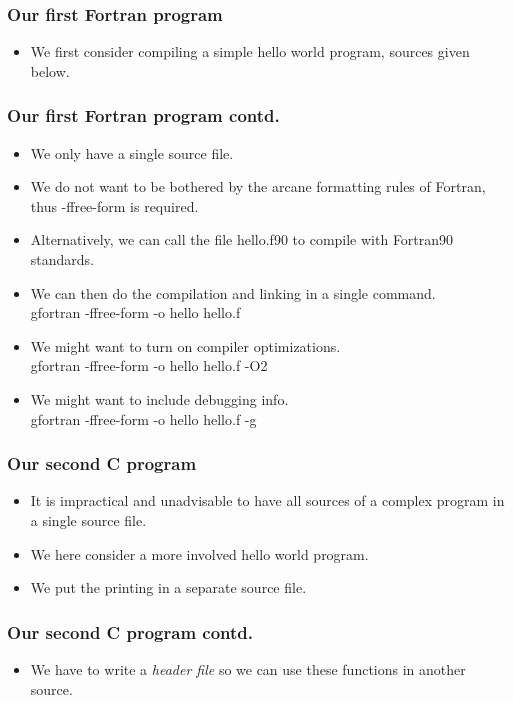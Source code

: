 \documentclass{beamer}
\begin{document}
\begin{frame}\frametitle{Our first Fortran program}
  \begin{itemize}
    \item We first consider compiling a simple hello world program, sources given below.
      
  \end{itemize}
\end{frame}

\begin{frame}\frametitle{Our first Fortran program contd.}
  \begin{itemize}
    \item We only have a single source file.
    \item We do not want to be bothered by the arcane formatting rules of Fortran, thus -ffree-form is required.
    \item Alternatively, we can call the file hello.f90 to compile with Fortran90 standards.
    \item We can then do the compilation and linking in a single command. \\
      gfortran -ffree-form -o hello hello.f
    \item We might want to turn on compiler optimizations. \\
      gfortran -ffree-form -o hello hello.f -O2
    \item We might want to include debugging info. \\
      gfortran -ffree-form -o hello hello.f -g
  \end{itemize}
\end{frame}

\begin{frame}\frametitle{Our second C program}
  \begin{itemize}
    \item It is impractical and unadvisable to have all sources of a complex program in a single source file.
    \item We here consider a more involved hello world program.
    \item We put the printing in a separate source file.
      
  \end{itemize}
\end{frame}

\begin{frame}\frametitle{Our second C program contd.}
  \begin{itemize}
    \item We have to write a \emph{header file} so we can use these functions in another source.
      
  \end{itemize}
\end{frame}
\end{document}
